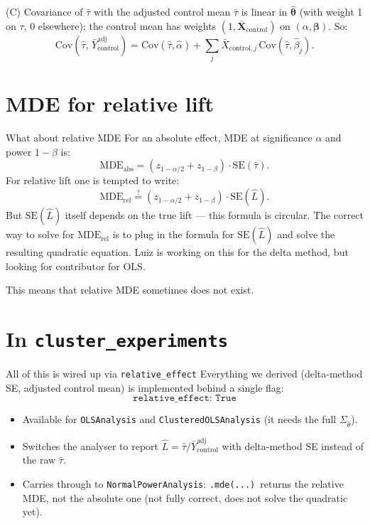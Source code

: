 \documentclass[10pt]{beamer}
\begin{document}
\begin{frame}{(C) Covariance of $\hat\tau$ with the adjusted control mean}
$\hat\tau$ is linear in $\hat{\bm\theta}$ (with weight 1 on $\tau$, $0$ elsewhere); the control mean has weights $(1, \bar{\mathbf{X}}_{\text{control}})$ on $(\alpha, \bm\beta)$. So:
\[
\mathrm{Cov}(\hat\tau,\,\bar{Y}^{\text{adj}}_{\text{control}})
= \mathrm{Cov}(\hat\tau, \hat\alpha) + \sum_{j} \bar{X}_{\text{control},j}\,\mathrm{Cov}(\hat\tau, \hat\beta_j).
\]
\end{frame}

\section{MDE for relative lift}

\begin{frame}{What about relative MDE}
For an absolute effect, MDE at significance $\alpha$ and power $1-\beta$ is:
\[
\mathrm{MDE}_{\text{abs}} = (z_{1-\alpha/2} + z_{1-\beta}) \cdot \mathrm{SE}(\hat\tau).
\]
For relative lift one is tempted to write:
\[
\mathrm{MDE}_{\text{rel}} \stackrel{?}{=} (z_{1-\alpha/2} + z_{1-\beta}) \cdot \mathrm{SE}(\hat L).
\]
But $\mathrm{SE}(\hat L)$ \alert{itself depends on the true lift} --- this formula is circular. The correct way to solve for $\mathrm{MDE}_{\text{rel}}$ is to plug in the formula for $\mathrm{SE}(\hat L)$ and solve the resulting \alert{quadratic equation}. Luiz is working on this for the delta method, but looking for contributor for OLS.


This means that \alert{relative MDE sometimes does not exist}.
\end{frame}

\section{In \texttt{cluster\_experiments}}

\begin{frame}{All of this is wired up via \texttt{relative\_effect}}
Everything we derived (delta-method SE, adjusted control mean) is implemented behind a single flag:
\[
\texttt{relative\_effect: True}
\]
\begin{itemize}
  \item Available for \texttt{OLSAnalysis} and \texttt{ClusteredOLSAnalysis} (it needs the full $\Sigma_{\hat\theta}$).
  \item Switches the analyser to report $\hat L = \hat\tau / \bar{Y}^{\text{adj}}_{\text{control}}$ with delta-method SE instead of the raw $\hat\tau$.
  \item Carries through to \texttt{NormalPowerAnalysis}: \texttt{.mde(...)}\ returns the relative MDE, not the absolute one (not fully correct, does not solve the quadratic yet).
\end{itemize}
\end{frame}
\end{document}
